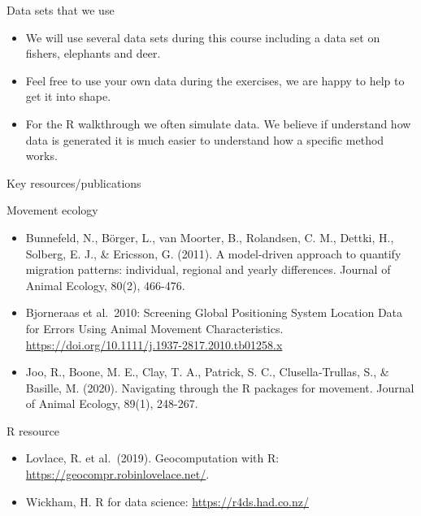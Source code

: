 \documentclass[ignorenonframetext,,t]{beamer}
\providecommand{\tightlist}{%
\setlength{\itemsep}{0pt}\setlength{\parskip}{0pt}}
\providecommand{\tightlist}{%
\setlength{\itemsep}{0pt}\setlength{\parskip}{0pt}}
\renewcommand{\tightlist}{\setlength{\itemsep}{1.4ex}\setlength{\parskip}{0pt}}
\begin{document}
\begin{frame}{Data sets that we use}
\protect\hypertarget{data-sets-that-we-use}{}
\begin{itemize}
\tightlist
\item
  We will use several data sets during this course including a data set
  on fishers, elephants and deer.
\item
  Feel free to use your own data during the exercises, we are happy to
  help to get it into shape.
\item
  For the R walkthrough we often simulate data. We believe if understand
  how data is generated it is much easier to understand how a specific
  method works.
\end{itemize}
\end{frame}

\begin{frame}{Key resources/publications}
\protect\hypertarget{key-resourcespublications}{}
\footnotesize

\begin{block}{Movement ecology}
\protect\hypertarget{movement-ecology}{}
\begin{itemize}
\tightlist
\item
  Bunnefeld, N., Börger, L., van Moorter, B., Rolandsen, C. M., Dettki,
  H., Solberg, E. J., \& Ericsson, G. (2011). A model‐driven approach to
  quantify migration patterns: individual, regional and yearly
  differences. Journal of Animal Ecology, 80(2), 466-476.
\item
  Bjorneraas et al.~2010: Screening Global Positioning System Location
  Data for Errors Using Animal Movement Characteristics.
  \url{https://doi.org/10.1111/j.1937-2817.2010.tb01258.x}
\item
  Joo, R., Boone, M. E., Clay, T. A., Patrick, S. C., Clusella‐Trullas,
  S., \& Basille, M. (2020). Navigating through the R packages for
  movement. Journal of Animal Ecology, 89(1), 248-267.
\end{itemize}
\end{block}

\begin{block}{R resource}
\protect\hypertarget{r-resource}{}
\begin{itemize}
\tightlist
\item
  Lovlace, R. et al.~(2019). Geocomputation with R:
  \url{https://geocompr.robinlovelace.net/}.
\item
  Wickham, H. R for data science: \url{https://r4ds.had.co.nz/}
\end{itemize}
\end{block}
\end{frame}
\end{document}
